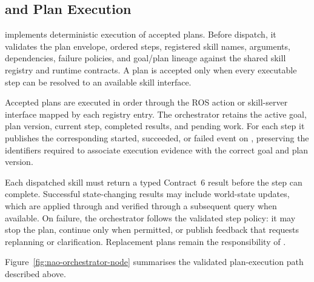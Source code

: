 \subsection{ and Plan Execution}

 implements deterministic execution of accepted plans. Before dispatch, it validates the plan envelope, ordered steps, registered skill names, arguments, dependencies, failure policies, and goal/plan lineage against the shared skill registry and runtime contracts. A plan is accepted only when every executable step can be resolved to an available skill interface.

Accepted plans are executed in order through the ROS action or skill-server interface mapped by each registry entry. The orchestrator retains the active goal, plan version, current step, completed results, and pending work. For each step it publishes the corresponding started, succeeded, or failed event on , preserving the identifiers required to associate execution evidence with the correct goal and plan version.

Each dispatched skill must return a typed Contract~6 result before the step can complete. Successful state-changing results may include world-state updates, which are applied through  and verified through a subsequent query when available. On failure, the orchestrator follows the validated step policy: it may stop the plan, continue only when permitted, or publish feedback that requests replanning or clarification. Replacement plans remain the responsibility of .

Figure~\ref{fig:nao-orchestrator-node} summarises the validated plan-execution path described above.

